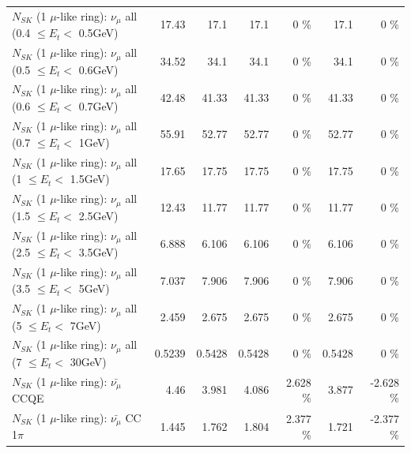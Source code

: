 \begin{table}
\begin{tabular}{| l | r | r | r  r | r  r |}
       $N_{SK}$ (1 $\mu$-like ring): $\nu_{\mu}$ all (0.4 $\leq E_{t} <$ 0.5GeV) &           17.43 &            17.1 &            17.1 &        0 \%  &            17.1 &        0 \%  \\ 
       $N_{SK}$ (1 $\mu$-like ring): $\nu_{\mu}$ all (0.5 $\leq E_{t} <$ 0.6GeV) &           34.52 &            34.1 &            34.1 &        0 \%  &            34.1 &        0 \%  \\ 
       $N_{SK}$ (1 $\mu$-like ring): $\nu_{\mu}$ all (0.6 $\leq E_{t} <$ 0.7GeV) &           42.48 &           41.33 &           41.33 &        0 \%  &           41.33 &        0 \%  \\ 
         $N_{SK}$ (1 $\mu$-like ring): $\nu_{\mu}$ all (0.7 $\leq E_{t} <$ 1GeV) &           55.91 &           52.77 &           52.77 &        0 \%  &           52.77 &        0 \%  \\ 
         $N_{SK}$ (1 $\mu$-like ring): $\nu_{\mu}$ all (1 $\leq E_{t} <$ 1.5GeV) &           17.65 &           17.75 &           17.75 &        0 \%  &           17.75 &        0 \%  \\ 
       $N_{SK}$ (1 $\mu$-like ring): $\nu_{\mu}$ all (1.5 $\leq E_{t} <$ 2.5GeV) &           12.43 &           11.77 &           11.77 &        0 \%  &           11.77 &        0 \%  \\ 
       $N_{SK}$ (1 $\mu$-like ring): $\nu_{\mu}$ all (2.5 $\leq E_{t} <$ 3.5GeV) &           6.888 &           6.106 &           6.106 &        0 \%  &           6.106 &        0 \%  \\ 
         $N_{SK}$ (1 $\mu$-like ring): $\nu_{\mu}$ all (3.5 $\leq E_{t} <$ 5GeV) &           7.037 &           7.906 &           7.906 &        0 \%  &           7.906 &        0 \%  \\ 
           $N_{SK}$ (1 $\mu$-like ring): $\nu_{\mu}$ all (5 $\leq E_{t} <$ 7GeV) &           2.459 &           2.675 &           2.675 &        0 \%  &           2.675 &        0 \%  \\ 
          $N_{SK}$ (1 $\mu$-like ring): $\nu_{\mu}$ all (7 $\leq E_{t} <$ 30GeV) &          0.5239 &          0.5428 &          0.5428 &        0 \%  &          0.5428 &        0 \%  \\ 
\hline
\hline
\hline
                              $N_{SK}$ (1 $\mu$-like ring): $\bar{\nu_\mu}$ CCQE &            4.46 &           3.981 &           4.086 &    2.628 \%  &           3.877 &   -2.628 \%  \\ 
                         $N_{SK}$ (1 $\mu$-like ring): $\bar{\nu_\mu}$ CC 1$\pi$ &           1.445 &           1.762 &           1.804 &    2.377 \%  &           1.721 &   -2.377 \%  \\ 

\end{tabular}
\end{table}
